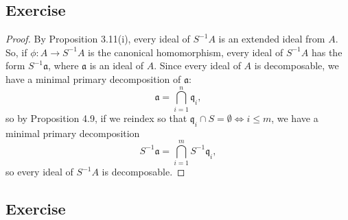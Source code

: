 \subsection{Exercise}\label{4.16}

\begin{proof}
By Proposition 3.11(i), every ideal of $S^{-1}A$ is an extended ideal from $A$. So, if $\phi : A \to S^{-1}A$ is the canonical homomorphism, every ideal of $S^{-1}A$ has the form
$S^{-1}\mathfrak{a}$, where $\mathfrak{a}$ is an ideal of $A$. Since every ideal of $A$ is decomposable, we have a minimal primary decomposition of $\mathfrak{a}$:
$$\mathfrak{a} = \bigcap_{i=1}^n \mathfrak{q}_i,$$
so by Proposition 4.9, if we reindex so that $\mathfrak{q}_i \cap S = \emptyset \iff i \le m$, we have a minimal primary decomposition
$$S^{-1}\mathfrak{a} = \bigcap_{i=1}^m S^{-1}\mathfrak{q}_i,$$
so every ideal of $S^{-1}A$ is decomposable.
\end{proof}

\subsection{Exercise}\label{4.17}


